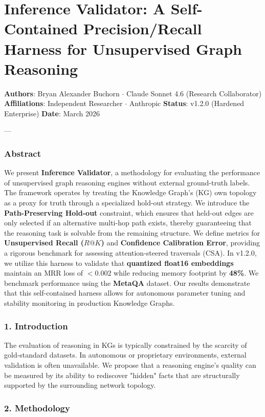 \section{Inference Validator: A Self-Contained Precision/Recall Harness for Unsupe\-rvised Graph Reasoning}

\textbf{Authors}: Bryan Alexander Buchorn $\cdot$ Claude Sonnet 4.6 (Research Collab\-orator)  
\textbf{Affili\-ations}: Independent Researcher $\cdot$ Anthropic  
\textbf{Status}: v1.2.0 (Hardened Enterprise)  
\textbf{Date}: March 2026

---

\subsubsection{Abstract}
We present \textbf{Inference Validator}, a methodology for evaluating the performance of unsup\-ervised graph reasoning engines without external ground-truth labels. The framework operates by treating the Knowledge Graph's (KG) own topology as a proxy for truth through a specialized hold-out strategy. We introduce the \textbf{Path-Preserving Hold-out} constraint, which ensures that held-out edges are only selected if an alternative multi-hop path exists, thereby guara\-nteeing that the reasoning task is solvable from the remaining structure. We define metrics for \textbf{Unsupe\-rvised Recall ($R@K$)} and \textbf{Confidence Calibration Error}, providing a rigorous benchmark for assessing attention-steered traversals (CSA). In v1.2.0, we utilize this harness to validate that \textbf{quantized float16 embeddings} maintain an MRR loss of $< 0.002$ while reducing memory footprint by \textbf{48\%}. We benchmark performance using the \textbf{MetaQA} \cite{metaqa2017} dataset. Our results demonstrate that this self-contained harness allows for autonomous parameter tuning and stability monitoring in production Knowledge Graphs.

\subsubsection{1. Introd\-uction}
The evaluation of reasoning in KGs is typically constrained by the scarcity of gold-standard datasets. In autonomous or proprietary envir\-onments, external validation is often unavailable. We propose that a reasoning engine's quality can be measured by its ability to rediscover "hidden" facts that are struc\-turally supported by the surrounding network topology.

\subsubsection{2. Methodology}

